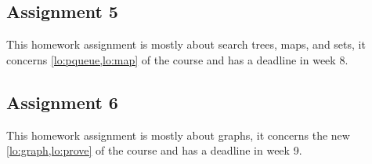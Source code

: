 \subsection*{Assignment 5}
\label{sub:assignment_5}

This homework assignment is mostly about search trees, maps, and sets, it concerns \cref{lo:pqueue,lo:map} of the course
and has a deadline in week 8.

\subsection*{Assignment 6}
\label{sub:assignment_6}

This homework assignment is mostly about graphs, it concerns the new \cref{lo:graph,lo:prove} of the course and has a
deadline in week 9.



